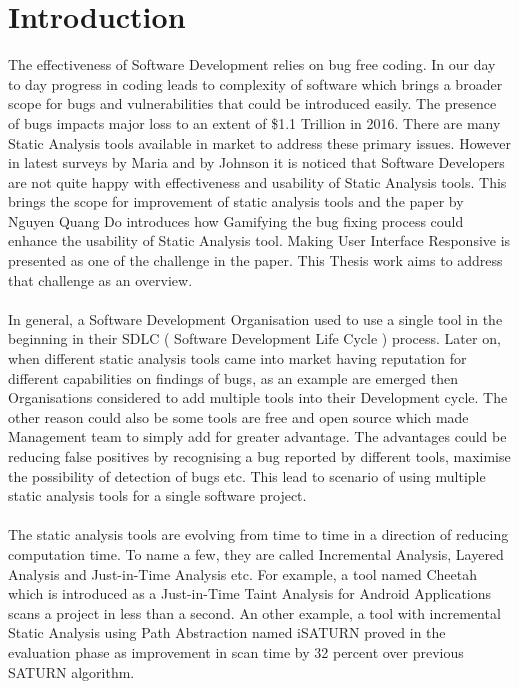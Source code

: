 \chapter{Introduction}
\label{ch:introduction}

The effectiveness of Software Development relies on bug free coding. In our day to day progress in coding leads to complexity of software which brings a broader scope for bugs and vulnerabilities that could be introduced easily. The presence of bugs impacts major loss to an extent of  \$1.1 Trillion in 2016. \cite{report} There are many Static Analysis tools available in market to address these primary issues. However in latest surveys by Maria \etal{} \cite{CB16} and by Johnson \etal{} \cite{JSMB13} it is noticed that Software Developers are not quite happy with effectiveness and usability of Static Analysis tools. This brings the scope for improvement of static analysis tools and the paper by Nguyen Quang Do \etal{} \cite{NB18} introduces how Gamifying the bug fixing process could enhance the usability of Static Analysis tool. Making User Interface Responsive is presented as one of the challenge in the paper. This Thesis work aims to address that challenge as an overview. 
\\ \\

In general, a Software Development Organisation used to use a single tool in the beginning in their SDLC ( Software Development Life Cycle ) process. Later on, when different static analysis tools came into market having reputation for different capabilities on findings of bugs, as an example are emerged then Organisations considered to add multiple tools into their Development cycle. The other reason could also be some tools are free and open source which made Management team to simply add for greater advantage. The advantages could be reducing false positives by recognising a bug reported by different tools, maximise the possibility of detection of bugs etc. This lead to scenario of using multiple static analysis tools for a single software project.
\\ \\

The static analysis tools are evolving from time to time in a direction of reducing computation time. To name a few, they are called Incremental Analysis, Layered Analysis and Just-in-Time Analysis etc. For example, a tool named Cheetah which is introduced as a Just-in-Time Taint Analysis for Android Applications scans a project in less than a second. An other example, a tool with incremental Static Analysis using Path Abstraction named iSATURN proved in the evaluation phase as improvement in scan time by 32 percent over previous SATURN algorithm. 
\\ \\

